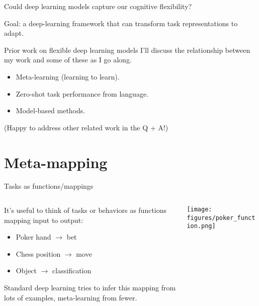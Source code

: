 \documentclass{beamer}
\begin{document}
\begin{frame}[standout]
Could deep learning models capture our cognitive flexibility?
\end{frame}


\begin{frame}[standout]
Goal: a deep-learning framework that can transform task representations to adapt.
\end{frame}



\begin{frame}{Prior work on flexible deep learning models}
I'll discuss the relationship between my work and some of these as I go along.
\begin{itemize}
    \item Meta-learning (learning to learn).
    \item Zero-shot task performance from language.
    \item Model-based methods. 
\end{itemize}
(Happy to address other related work in the Q + A!)
\end{frame}

\section{Meta-mapping}

\begin{frame}{Tasks as functions/mappings}
\begin{columns}
\begin{column}{0.5\textwidth}
It's useful to think of tasks or behaviors as functions mapping input to output:
\begin{itemize}
    \item Poker hand \(\rightarrow\) bet
    \item Chess position \(\rightarrow\) move
    \item Object \(\rightarrow\) classification
\end{itemize}
Standard deep learning tries to infer this mapping from lots of examples, meta-learning from fewer. 
\end{column}

\begin{column}{0.5\textwidth}
\texttt{[image: figures/poker\_function.png]}
\end{column}
\end{columns}
\end{frame}
\end{document}
